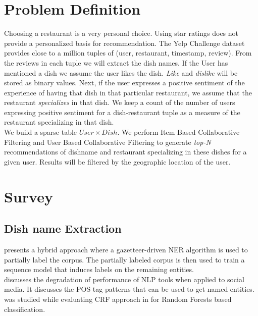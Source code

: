\documentclass[twoside,12pt]{article}
\begin{document}
\section{Problem Definition}
\label{Problem Definition}
Choosing a restaurant is a very personal choice. Using star ratings does not provide a personalized basis for recommendation. The Yelp Challenge dataset provides close to a million tuples of (user, restaurant, timestamp, review). From the reviews in each tuple we will extract the dish names. If the User has mentioned a dish we assume the user likes the dish. \textit{Like} and \textit{dislike} will be stored as binary values. Next, if the user expresses a positive sentiment of the experience of having that dish in that particular restaurant,  we assume that the restaurant \textit{specializes} in that dish.
We keep a count of the number of users expressing positive sentiment for a dish-restaurant tuple as a measure of the restaurant specializing in that dish.\\

We build a sparse table $User \times Dish$. We perform Item Based Collaborative Filtering and User Based Collaborative Filtering to generate  \textit{top-N} recommendations of dishname and restaurant specializing in these dishes for a given user. Results will be filtered by the geographic location of the user.


\section{Survey}
\label{Survey}

\subsection{Dish name Extraction}

\cite{andrew_scott} presents a hybrid approach where a gazetteer-driven NER algorithm is used to partially label the corpus. The partially labeled corpus is then used to train a sequence model that induces labels on the remaining entities.\\

\cite{ritter_clark} discusses the degradation of performance of NLP tools when applied to social media. It discusses the POS tag patterns that can be used to get named entities.\\

\cite{lafferty_2001} was studied while evaluating CRF approach in  \cite{tzonghan} for Random Forests based classification. \\
\end{document}
